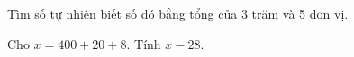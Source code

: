 \begin{ex} %
Tìm số tự nhiên biết số đó bằng tổng của 3 trăm và 5 đơn vị.
\end{ex}

\begin{ex} %
Cho $x = 400 + 20 + 8$. Tính $x - 28$.
\end{ex}
